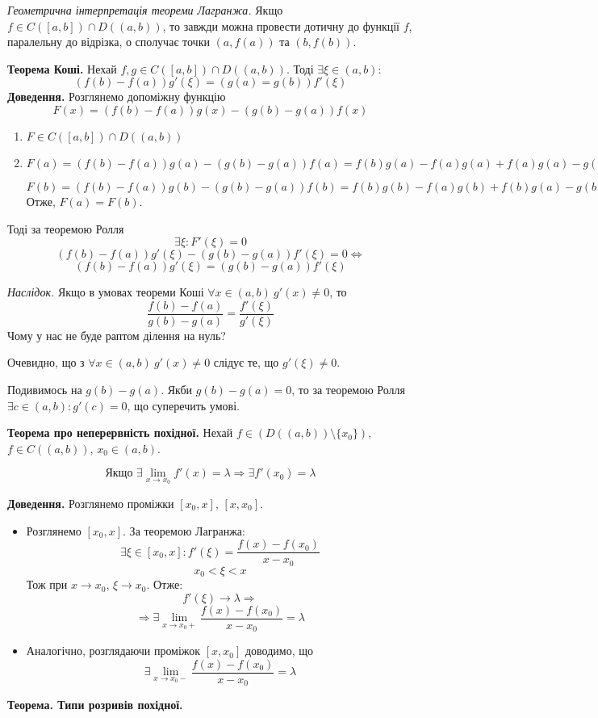 \documentclass[12pt]{report}
\begin{document}
\textit{Геометрична інтерпретація теореми Лагранжа.} Якщо $f \in C([a,b]) \cap D((a,b))$, то завжди можна провести дотичну до функції $f$, паралельну до відрізка, о сполучає точки $(a, f(a))$ та $(b, f(b))$.

\vspace{3mm}

\textbf{Теорема Коші.}  
Нехай $f, g \in C([a,b]) \cap D((a,b))$. Тоді $\exists \xi \in (a,b):$
$$(f(b) - f(a))g'(\xi) = (g(a) = g(b))f'(\xi)$$
\textbf{Доведення.} Розглянемо допоміжну функцію 
$$F(x) = (f(b) - f(a))g(x) - (g(b) - g(a))f(x)$$
\begin{enumerate}
\item $F \in C([a,b])\cap D((a,b))$
\item $F(a) = (f(b) - f(a))g(a) - (g(b) - g(a))f(a) = f(b)g(a) - f(a)g(a) + f(a)g(a) - g(b)f(a) = f(b)g(a) - g(b)f(a)$

\vspace{1mm}

$F(b) = (f(b) - f(a))g(b) - (g(b) - g(a))f(b) = f(b)g(b) - f(a)g(b) + f(b)g(a) - g(b)f(b) = f(b)g(a) - g(b)f(a)$
Отже, $F(a) = F(b)$.
\end{enumerate}

Тоді за теоремою Ролля 
$$\exists \xi : F'(\xi) = 0$$
$$(f(b) - f(a))g'(\xi) - (g(b) - g(a))f'(\xi) = 0 \Longleftrightarrow$$
$$(f(b) - f(a))g'(\xi) = (g(b) - g(a))f'(\xi) $$

\textit{Наслідок.} Якщо в умовах теореми Коші $\forall x \in (a,b) \ g'(x) \neq 0$, то
$$\frac{f(b) - f(a)}{g(b) - g(a)} = \frac{f'(\xi)}{g'(\xi)}$$
Чому у нас не буде раптом ділення на нуль?

Очевидно, що з $\forall x \in (a,b) \ g'(x) \neq 0$ слідує те, що $g'(\xi) \neq 0$.

Подивимось на $g(b) - g(a)$. Якби $g(b) - g(a) = 0$, то за теоремою Ролля $\exists c \in (a,b) : g'(c) = 0$, що суперечить умові.

\textbf{Теорема про неперервність похідної.} Нехай $f \in (D((a,b))\setminus \{x_0\})$, $f \in C((a,b))$, $x_0 \in (a,b)$.

$$\textrm{Якщо } \exists \lim_{x \to x_0}f'(x) = \lambda \Longrightarrow \exists f'(x_0) = \lambda$$

\textbf{Доведення.} Розглянемо проміжки $[x_0, x]$, $[x, x_0]$.

\begin{itemize}
\item Розглянемо $[x_0, x]$. За теоремою Лагранжа:
$$\exists \xi \in [x_0, x]: f'(\xi) = \frac{f(x) - f(x_0)}{x - x_0}$$
$$x_0 < \xi < x$$
Тож при $x \to x_0$, $\xi \to x_0$. Отже:
$$f'(\xi) \to \lambda \Longrightarrow$$
$$\Longrightarrow \exists \lim_{x \to x_0+}\frac{f(x) - f(x_0)}{x - x_0} = \lambda$$
\item Аналогічно, розглядаючи проміжок $[x, x_0]$ доводимо, що 
$$\exists \lim_{x\to x_0 - }\frac{f(x) - f(x_0)}{x - x_0} = \lambda$$

\end{itemize}
\textbf{Теорема. Типи розривів похідної.}
\end{document}
